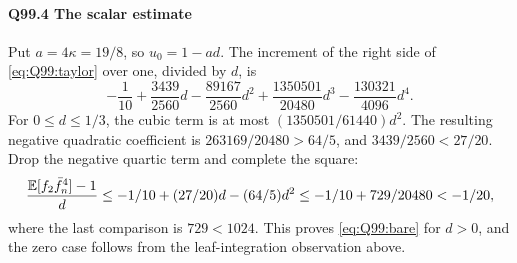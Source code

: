 \paragraph{Q99.4 The scalar estimate}\label{part:Q99.4}
Put $a=\allowbreak 4\kappa=\allowbreak 19/8$, so $u_0=\allowbreak 1-ad$. The increment of the
right side of \eqref{eq:Q99:taylor} over one, divided by $d$, is
\[
 -\frac1{10}+\frac{3439}{2560}d-\frac{89167}{2560}d^2
 +\frac{1350501}{20480}d^3-\frac{130321}{4096}d^4.
\]
For $0\le\allowbreak  d\le\allowbreak 1/3$, the cubic term is at most
$(1350501/61440)d^2$. The resulting negative quadratic coefficient
is $263169/20480>\allowbreak 64/5$, and $3439/2560<\allowbreak 27/20$.
Drop the negative quartic term and complete the square:
\[
 \frac{\mathbb E[f_2\bar f_n^4]-1}{d}
 \le-1/10+(27/20)d-(64/5)d^2
 \le-1/10+729/20480<-1/20,
\]
where the last comparison is $729<\allowbreak 1024$.
This proves \eqref{eq:Q99:bare} for $d>\allowbreak 0$, and the zero case follows
from the leaf-integration observation above.
